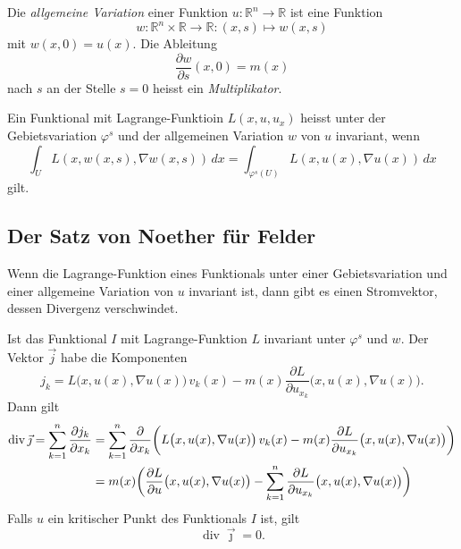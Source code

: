 \begin{definition}
Die {\em allgemeine Variation} einer Funktion
%
\(
u
\colon
\mathbb{R}^n\to \mathbb{R}
\)
ist eine Funktion
\[
w
\colon
\mathbb{R}^n \times\mathbb{R}
\to
\mathbb{R}
:
(x,s)
\mapsto
w(x,s)
\]
mit $w(x,0)=u(x)$.
Die Ableitung
\[
\frac{\partial w}{\partial s}(x,0) = m(x)
\]
nach $s$ an der Stelle $s=0$ heisst ein {\em Multiplikator}.
%
\end{definition}

\begin{definition}
Ein Funktional mit Lagrange-Funktioin
$L(x,u,u_x)$ heisst unter der Gebietsvariation $\varphi^s$ und
der allgemeinen Variation $w$ von $u$ invariant, wenn
\begin{equation}
\int_U
L(x,w(x,s),\nabla w(x,s))\,dx
=
\int_{\varphi^s(U)}
L(x,u(x),\nabla u(x))\,dx
\label{buch:symmetrien:felder:eqn:invarianz}
\end{equation}
gilt.
\end{definition}

%
%
\subsection{Der Satz von Noether für Felder}
Wenn die Lagrange-Funktion eines Funktionals unter einer Gebietsvariation
und einer allgemeine Variation von $u$ invariant ist, dann gibt es einen
Stromvektor, dessen Divergenz verschwindet.

\begin{satz}
Ist das Funktional $I$ mit Lagrange-Funktion $L$ invariant unter $\varphi^s$
und $w$.
Der Vektor $\vec{j}$ habe die Komponenten
%
\[
j_k
=
L\bigl(x,u(x),\nabla u(x)\bigr)\,v_k(x)
-
m(x)
\frac{\partial L}{\partial u_{x_k}}\bigl(x,u(x),\nabla u(x)\bigr).
\]
Dann gilt
\begin{align}
\operatorname{div}\vec{\jmath}
=
\sum_{k=1}^n \frac{\partial j_k}{\partial x_k}
&=
\sum_{k=1}^n
\frac{\partial }{\partial x_k}
\biggl(
L\bigl(x,u(x),\nabla u(x)\bigr)\,v_k(x)
-
m(x)
\frac{\partial L}{\partial u_{x_k}}
\bigl(x,u(x),\nabla u(x)\bigr)
\biggr)
\notag
\\
&=
m(x)\biggl(
\frac{\partial L}{\partial u}\bigl(x,u(x),\nabla u(x)\bigr)
-
\sum_{k=1}^n\frac{\partial L}{\partial u_{x_k}}\bigl(x,u(x),\nabla u(x)\bigr)
\biggr)
\label{buch:symmetrien:felder:eqn:rhs}
\end{align}
Falls $u$ ein kritischer Punkt des Funktionals $I$ ist, gilt
\[
\operatorname{div}\vec{\jmath}=0.
\]
\end{satz}

